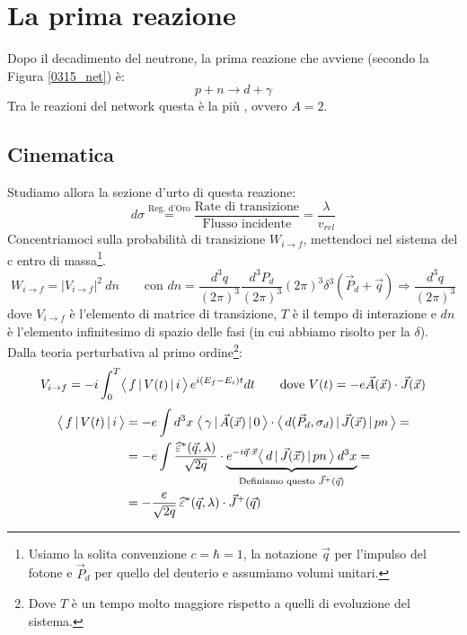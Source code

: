 \section{La prima reazione}\label{0317-sec-abinitio}
Dopo il decadimento del neutrone, la prima reazione che avviene (secondo la Figura \ref{0315_net}) è:
$$p + n \to d + \gamma$$
Tra le reazioni del network questa è la più , ovvero $A=2$. 

\subsection{Cinematica} 
Studiamo allora la sezione d'urto di questa reazione:
$$d\sigma \overset{\text{Reg. d'Oro}}{=} \frac{\text{Rate di transizione}}{\text{Flusso incidente}} = \frac{\lambda}{v_{rel}}$$
Concentriamoci sulla probabilità di transizione $W_{i\to f}$, mettendoci nel sistema del c  entro di massa\footnote{Usiamo la solita convenzione $c=\hbar = 1$, la notazione $\vec{q}$ per l'impulso del fotone e $\vec{P}_d$ per quello del deuterio e assumiamo volumi unitari.}.
$$W_{i\to f} = |V_{i\to f}|^2\:dn \qquad \text{con   } dn = \frac{d^3q}{(2\pi)^3}\frac{d^3P_d}{(2\pi)^3} (2\pi)^3 \delta^3(\vec{P}_d+\vec{q}) \Rightarrow \frac{d^3q}{(2\pi)^3}$$
dove $V_{i\to f}$ è l'elemento di matrice di transizione, $T$ è il tempo di interazione e $dn$ è l'elemento infinitesimo di spazio delle fasi (in cui abbiamo risolto per la $\delta$). Dalla teoria perturbativa al primo ordine\footnote{Dove $T$ è un tempo molto maggiore rispetto a quelli di evoluzione del sistema.}:
$$V_{i\to f} = -i \int_0^T \bigl\langle\, f\, |\,V(t)\, |\,i\, \bigr\rangle\, e^{i(E_f-E_i)t} dt \qquad \text{dove } V(t) = -e \vec{A}(\vec{x}) \cdot \vec{J}(\vec{x}) $$
\begin{displaymath}
\begin{aligned}
\bigl\langle\, f\, |\,V(t)\, |\,i\, \bigr\rangle &= - e\int d^3x \; \bigl\langle\, \gamma\, |\,\vec{A}(\vec{x})\, |\,0\, \bigr\rangle \cdot \bigl\langle\, d(\vec{P}_d,\sigma_d)\, |\,\vec{J}(\vec{x})\, |\,pn\, \bigr\rangle = \\
&= -e \int \frac{\widehat{\varepsilon}^*(\vec{q},\lambda)}{\sqrt{2q}} \cdot \underbrace{e^{-i\vec{q}\cdot\vec{x}}\bigl\langle\, d\, |\,\vec{J}(\vec{x})\, |\,pn\, \bigr\rangle\: d^3x}_{\text{Definiamo questo } \vec{J}^+(\vec{q})} = \\
&= -\frac{e}{\sqrt{2q}} \, \widehat{\varepsilon}^*(\vec{q},\lambda) \cdot \vec{J}^+(\vec{q})
\end{aligned}
\end{displaymath}
